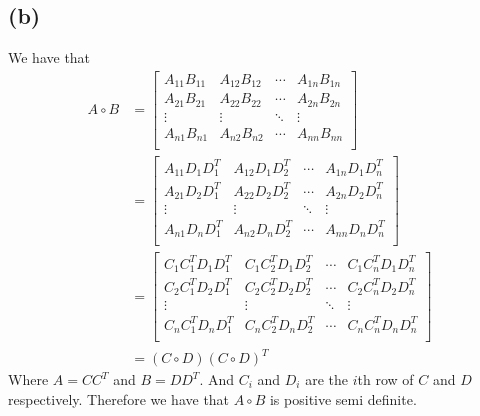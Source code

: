 \documentclass[11pt]{article}
\begin{document}
\subsection*{(b)}
We have that 
\begin{align*}
    A \circ B & =\begin{bmatrix}
        A_{11} B_{11} & A_{12} B_{12} & \cdots & A_{1n} B_{1n}\\
        A_{21} B_{21} & A_{22} B_{22} & \cdots & A_{2n} B_{2n}\\
        \vdots & \vdots & \ddots & \vdots\\
        A_{n1} B_{n1} & A_{n2} B_{n2} & \cdots & A_{nn} B_{nn}\\
    \end{bmatrix}\\
    &= \begin{bmatrix}
        A_{11} D_{1} D_{1}^T & A_{12} D_{1} D_{2}^T & \cdots & A_{1n} D_{1} D_{n}^T\\
        A_{21} D_{2} D_{1}^T & A_{22} D_{2} D_{2}^T & \cdots & A_{2n} D_{2} D_{n}^T\\
        \vdots & \vdots & \ddots & \vdots\\
        A_{n1} D_{n} D_{1}^T & A_{n2} D_{n} D_{2}^T & \cdots & A_{nn} D_{n} D_{n}^T\\
    \end{bmatrix}\\
    &= \begin{bmatrix}
        C_{1}C_{1}^T D_{1} D_{1}^T & C_{1}C_{2}^T D_{1} D_{2}^T & \cdots & C_{1}C_{n}^T D_{1} D_{n}^T\\
        C_{2}C_{1}^T D_{2} D_{1}^T & C_{2}C_{2}^T D_{2} D_{2}^T & \cdots & C_{2}C_{n}^T D_{2} D_{n}^T\\
        \vdots & \vdots & \ddots & \vdots\\
        C_{n}C_{1}^T D_{n} D_{1}^T & C_{n}C_{2}^T D_{n} D_{2}^T & \cdots & C_{n}C_{n}^T D_{n} D_{n}^T\\
    \end{bmatrix}\\
    &=(C\circ D) (C\circ D)^T
\end{align*}
Where $A=CC^T$ and $B=DD^T$. And $C_{i}$ and $D_{i}$ are the $i$th row of $C$ and $D$ respectively. Therefore we have that $A \circ B$ is positive semi definite.
\end{document}
